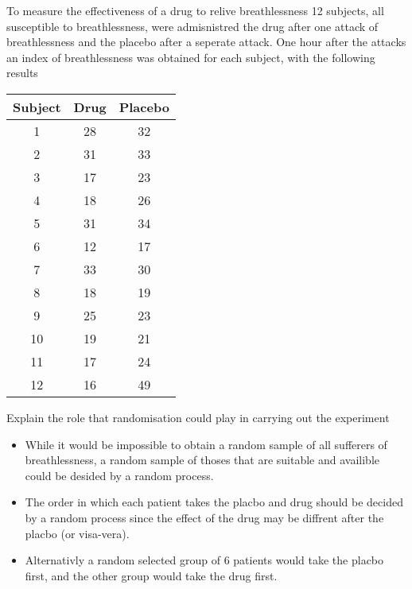         \begin{example}
        {
            To measure the effectiveness of a drug to relive breathlessness 12 subjects, all susceptible to breathlessness, were admisnistred the drug after one attack of breathlessness and the placebo after a seperate attack. One hour after the attacks an index of breathlessness was obtained for each subject, with the following results

            \begin{center}
            \begin{tabular}{c|c|c}
            Subject & Drug & Placebo \\
            \hline
            1  & 28 & 32 \\
            2  & 31 & 33 \\
            3  & 17 & 23 \\
            4  & 18 & 26 \\
            5  & 31 & 34 \\
            6  & 12 & 17 \\
            7  & 33 & 30 \\
            8  & 18 & 19 \\
            9  & 25 & 23 \\
            10 & 19 & 21 \\
            11 & 17 & 24 \\
            12 & 16 & 49 \\
            \end{tabular}
            \end{center}
        }

        \begin{step}{Explain the role that randomisation could play in carrying out the experiment}
        \begin{itemize}
        \item While it would be impossible to obtain a random sample of all sufferers of breathlessness, a random sample of thoses that are suitable and availible could be desided by a random process.
        \item The order in which each patient takes the placbo and drug should be decided by a random process since the effect of the drug may be diffrent after the placbo (or visa-vera).
        \item Alternativly a random selected group of 6 patients would take the placbo first, and the other group would take the drug first.
        \end{itemize}
        \end{step}


\end{example}
